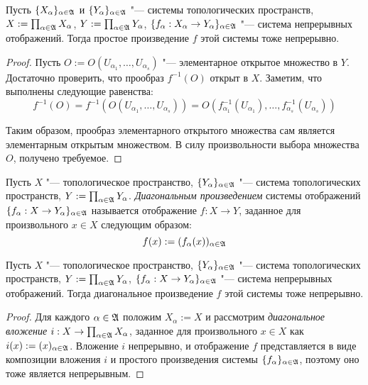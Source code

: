 \begin{proposition}
    Пусть $\lbrace X_{\alpha}\rbrace_{\alpha \in \mathfrak A}$ и $\lbrace Y_{\alpha}\rbrace_{\alpha \in \mathfrak A}$ "--- системы топологических пространств, $X := \prod_{\alpha \in \mathfrak A}X_{\alpha}$, $Y := \prod_{\alpha \in \mathfrak A}Y_{\alpha}$, $\{f_\alpha: X_\alpha \to Y_\alpha\}_{\alpha \in \mathfrak A}$ "--- система непрерывных отображений. Тогда простое произведение $f$ этой системы тоже непрерывно.
\end{proposition}

\begin{proof}
    Пусть $O := O(U_{\alpha_1}, \ldots, U_{\alpha_s})$ "--- элементарное открытое множество в $Y$. Достаточно проверить, что прообраз $f^{-1}(O)$ открыт в $X$. Заметим, что выполнены следующие равенства:
    \[f^{-1}(O) = f^{-1}(O(U_{\alpha_1}, \ldots, U_{\alpha_s})) = O(f_{\alpha_1}^{-1}(U_{\alpha_1}), \ldots, f_{\alpha_s}^{-1}(U_{\alpha_s}))\]

    Таким образом, прообраз элементарного открытого множества сам является элементарным открытым множеством. В силу произвольности выбора множества $O$, получено требуемое.
\end{proof}

\begin{definition}
    Пусть $X$ "--- топологическое пространство, $\lbrace Y_{\alpha}\rbrace_{\alpha \in \mathfrak A}$ "--- система топологических пространств, $Y := \prod_{\alpha \in \mathfrak A}Y_{\alpha}$. \textit{Диагональным произведением} системы отображений $\{f_\alpha: X \to Y_\alpha\}_{\alpha \in \mathfrak A}$ называется отображение $f : X \to Y$, заданное для произвольного $x \in X$ следующим образом:
    \[f(x) := (f_\alpha(x))_{\alpha \in \mathfrak A}\]
\end{definition}

\begin{proposition}
    Пусть $X$ "--- топологическое пространство, $\lbrace Y_{\alpha}\rbrace_{\alpha \in \mathfrak A}$ "--- система топологических пространств, $Y := \prod_{\alpha \in \mathfrak A}Y_{\alpha}$, $\{f_\alpha: X \to Y_\alpha\}_{\alpha \in \mathfrak A}$ "--- система непрерывных отображений. Тогда диагональное произведение $f$ этой системы тоже непрерывно.
\end{proposition}

\begin{proof}
    Для каждого $\alpha \in \mathfrak A$ положим $X_{\alpha} := X$ и рассмотрим \textit{диагональное вложение} $i: X \rightarrow \prod_{\alpha \in \mathfrak A}X_{\alpha}$, заданное для произвольного $x \in X$ как $i(x) := (x)_{\alpha \in \mathfrak A}$. Вложение $i$ непрерывно, и отображение $f$ представляется в виде композиции вложения $i$ и простого произведения системы $\{f_{\alpha}\}_{\alpha \in \mathfrak A}$, поэтому оно тоже является непрерывным.
\end{proof}


